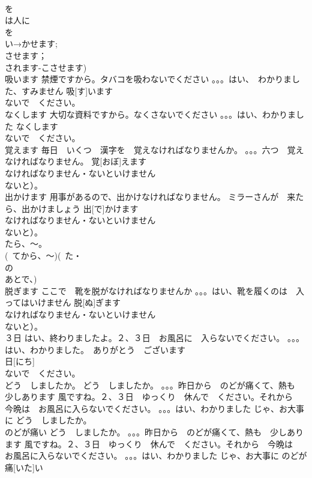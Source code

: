 \documentclass[8pt]{extreport}
\begin{document}
\begin{CJK}{UTF8}{min}
\\	を
\\	は人に
\\	を
\\	い→かせます;
\\	させます；
\\	されます-こさせます)
\\	吸います	禁煙ですから。タバコを吸わないでください 。。。はい、　わかりました、すみません	吸[す]います			
\\	ないで　ください。
\\	なくします	大切な資料ですから。なくさないでください 。。。はい、わかりました	なくします			
\\	ないで　ください。
\\	覚えます	毎日　いくつ　漢字を　覚えなければなりませんか。 。。。六つ　覚えなければなりません。	覚[おぼ]えます			
\\	なければなりません・ないといけません
\\	ないと）。
\\	出かけます	用事があるので、出かけなければなりません。 ミラーさんが　来たら、出かけましょう	出[で]かけます			
\\	なければなりません・ないといけません
\\	ないと）。
\\	たら、～。
\\	(~てから、～)(~た・
\\	の
\\	あとで、)		
\\	脱ぎます	ここで　靴を脱がなければなりませんか 。。。はい、靴を履くのは　入ってはいけません	脱[ぬ]ぎます			
\\	なければなりません・ないといけません
\\	ないと）。
\\	３日	はい、終わりましたよ。２、３日　お風呂に　入らないでください。 。。。はい、わかりました。　ありがとう　ございます	
\\	日[にち]			
\\	ないで　ください。
\\	どう　しましたか。	どう　しましたか。 。。。昨日から　のどが痛くて、熱も　少しあります 風ですね。２、３日　ゆっくり　休んで　ください。それから　今晩は　お風呂に入らないでください。 。。。はい、わかりました じゃ、お大事に	どう　しましたか。			
\\	のどが痛い	どう　しましたか。 。。。昨日から　のどが痛くて、熱も　少しあります 風ですね。２、３日　ゆっくり　休んで　ください。それから　今晩は　お風呂に入らないでください。 。。。はい、わかりました じゃ、お大事に	のどが 痛[いた]い					

\end{CJK}
\end{document}
